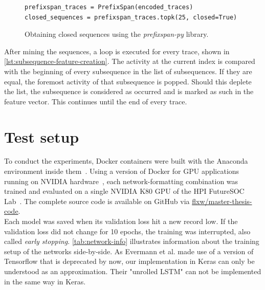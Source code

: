 \begin{figure}
\begin{verbatim}
prefixspan_traces = PrefixSpan(encoded_traces)
closed_sequences = prefixspan_traces.topk(25, closed=True)
\end{verbatim}
\caption{Obtaining closed sequences using the \textit{prefixspan-py} library.}
\label{lst:pfs-mining}
\end{figure}

After mining the sequences, a loop is executed for every trace, shown in \autoref{lst:subsequence-feature-creation}. The activity at the current index is compared with the beginning of every subsequence in the list of subsequences. If they are equal, the foremost activity of that subsequence is popped. Should this deplete the list, the subsequence is considered as occurred and is marked as such in the feature vector. This continues until the end of every trace.

\section{Test setup}
\label{sec:eval:test-setup}
To conduct the experiments, Docker containers were built with the Anaconda environment inside them~\cite{web:docker}. Using a version of Docker for GPU applications running on NVIDIA hardware~\cite{web:nvidia-docker}, each network-formatting combination was trained and evaluated on a single NVIDIA K80 GPU of the HPI FutureSOC Lab~\cite{web:fsoc}. The complete source code is available on GitHub via \href{https://github.com/flxw/master-thesis-code}{flxw/master-thesis-code}.\\

Each model was saved when its validation loss hit a new record low. If the validation loss did not change for 10 epochs, the training was interrupted, also called \textit{early stopping}. \autoref{tab:network-info} illustrates information about the training setup of the networks side-by-side. As Evermann et al. made use of a version of Tensorflow that is deprecated by now, our implementation in Keras can only be understood as an approximation. Their "unrolled LSTM" can not be implemented in the same way in Keras.

